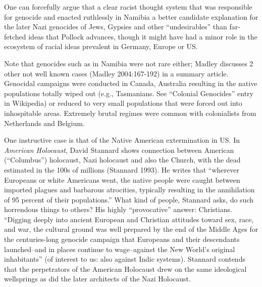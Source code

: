 One can forcefully argue that a clear racist thought system that was responsible for genocide and enacted ruthlessly in Namibia a better candidate explanation for the later Nazi genocides of  Jews, Gypsies and other “undesirables” than far-fetched ideas that Pollock advances, though it might have had a minor role in the ecosystem of racial ideas prevalent in Germany, Europe or US.

Note that genocides such as in Namibia were not rare either; Madley discusses 2 other not well known cases (Madley 2004:167-192) in a summary article. Genocidal campaigns were conducted in Canada, Australia resulting in the native populations totally wiped out (e.g., Tasmanians. See “Colonial Genocides” entry in Wikipedia) or reduced to very small populations that were forced out into inhospitable areas.  Extremely brutal regimes were common with colonialists from Netherlands and Belgium.

One instructive case is that of the Native American extermination in US.  In {\sl American Holocaust}, David Stannard shows connection between American (“Columbus”) holocaust, Nazi holocaust and also the Church, with the dead estimated in the 100s of millions (Stannard 1993). He writes that “wherever Europeans or white Americans went, the native people were caught between imported plagues and barbarous atrocities, typically resulting in the annihilation of 95 percent of their populations.” What kind of people, Stannard asks, do such horrendous things to others? His highly “provocative” answer: Christians. “Digging deeply into ancient European and Christian attitudes toward sex, race, and war, the cultural ground was well prepared by the end of the Middle Ages for the centuries-long genocide campaign that Europeans and their descendants launched--and in places continue to wage--against the New World's original inhabitants” (of interest to us: also against Indic systems). Stannard contends that the perpetrators of the American Holocaust drew on the same ideological wellsprings as did the later architects of the Nazi Holocaust.


